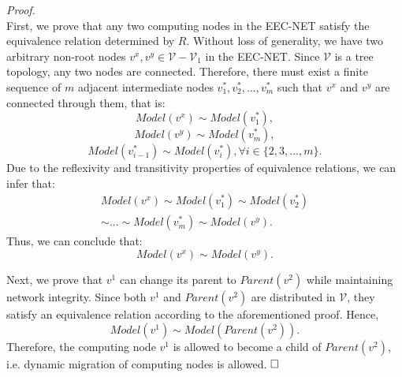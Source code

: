 \documentclass[10pt,journal]{IEEEtran}
\begin{document}
\noindent
\textit{Proof.} \\
\noindent 
First, we prove that any two computing nodes in the EEC-NET satisfy the equivalence relation determined by $R$. Without loss of generality, we have two arbitrary non-root nodes $v^x,v^y \in \mathcal{V} - \mathcal{V}_1$ in the EEC-NET. Since $\mathcal{V}$ is a tree topology, any two nodes are connected. Therefore, there must exist a finite sequence of $m$ adjacent intermediate nodes $v^*_1,v^*_2,...,v^*_m$ such that $v^x$ and $v^y$ are connected through them, that is:
\begin{equation}
    Model(v^x)\sim Model(v^*_1),
\end{equation}
\begin{equation}
    Model(v^y)\sim Model(v^*_m),
\end{equation}
\begin{equation}
    Model(v^*_{i-1})\sim Model(v^*_i),\forall i \in \{2,3,...,m\}.
\end{equation}
Due to the reflexivity and transitivity properties of equivalence relations, we can infer that:
\begin{equation}
    \begin{array}{l}
         Model(v^x)\sim Model(v^*_1)\sim Model(v^*_2) \\ \sim ... \sim Model(v^*_m) \sim Model(v^y).
    \end{array}
\end{equation}
Thus, we can conclude that:
\begin{equation}
    Model(v^x)\sim Model(v^y).
\end{equation}


\noindent
Next, we prove that $v^1$ can change its parent to $Parent(v^2)$ while maintaining network integrity. Since both $v^1$ and $Parent(v^2)$ are distributed in $\mathcal{V}$, they satisfy an equivalence relation according to the aforementioned proof. Hence,
\begin{equation}
    Model(v^1) \sim Model(Parent(v^2)).
\end{equation}
Therefore, the computing node $v^1$ is allowed to become a child of $Parent(v^2)$, i.e. dynamic migration of computing nodes is allowed. 
$\hfill \square$



\end{document}
